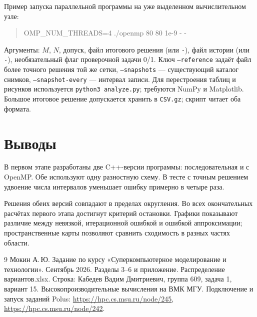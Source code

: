 \documentclass[12pt,a4paper]{article}
\begin{document}
Пример запуска параллельной программы на уже выделенном вычислительном узле:
\begin{quote}\ttfamily\small
OMP\_NUM\_THREADS=4 ./openmp 80 80 1e-9 - -
\end{quote}
Аргументы: $M$, $N$, допуск, файл итогового решения (или \texttt{-}), файл истории (или \texttt{-}), необязательный флаг проверочной задачи 0/1. Ключ \texttt{--reference} задаёт файл более точного решения той же сетки, \texttt{--snapshots} --- существующий каталог снимков, \texttt{--snapshot-every} --- интервал записи. Для перестроения таблиц и рисунков используется \texttt{python3 analyze.py}; требуются NumPy и Matplotlib. Большое итоговое решение допускается хранить в \texttt{CSV.gz}; скрипт читает оба формата.

\section{Выводы}
В первом этапе разработаны две C++-версии программы: последовательная и с OpenMP. Обе используют одну разностную схему. В тесте с точным решением удвоение числа интервалов уменьшает ошибку примерно в четыре раза.

Решения обеих версий совпадают в пределах округления. Во всех окончательных расчётах первого этапа достигнут критерий остановки. Графики показывают различие между невязкой, итерационной ошибкой и ошибкой аппроксимации; пространственные карты позволяют сравнить сходимость в разных частях области.



\begingroup
\small
\begin{thebibliography}{9}
 Мокин А.\,Ю. Задание по курсу «Суперкомпьютерное моделирование и технологии». Сентябрь 2026. Разделы 3--6 и приложение.
 Распределение вариантов.xlsx. Строка: Кабедев Вадим Дмитриевич, группа 609, задача 1, вариант 15.
 Высокопроизводительные вычисления на ВМК МГУ. Подключение и запуск заданий Polus: \url{https://hpc.cs.msu.ru/node/245}, \url{https://hpc.cs.msu.ru/node/242}.
\end{thebibliography}
\endgroup
\end{document}
